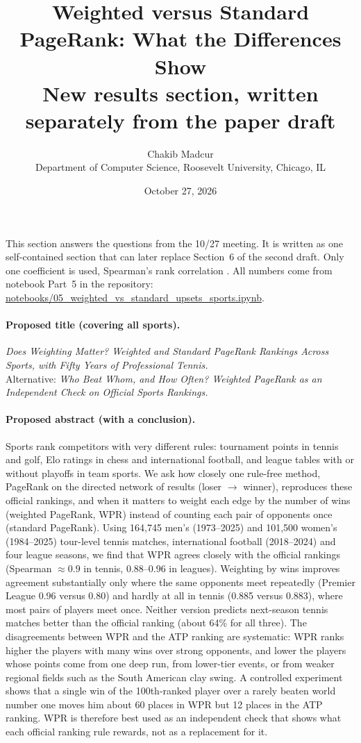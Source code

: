 \documentclass[11pt]{article}
\title{Weighted versus Standard PageRank: What the Differences Show\\[0.4em]
\large New results section, written separately from the paper draft}
\author{Chakib Madcur\\
\small Department of Computer Science, Roosevelt University, Chicago, IL}
\date{October 27, 2026}
\begin{document}
\maketitle

\noindent This section answers the questions from the 10/27 meeting. It is written as one self-contained section that can later replace Section~6 of the second draft. Only one coefficient is used, Spearman's rank correlation \citep{spearman1904}. All numbers come from notebook Part~5 in the repository:\\ \url{notebooks/05_weighted_vs_standard_upsets_sports.ipynb}.

\paragraph{Proposed title (covering all sports).}
\emph{Does Weighting Matter? Weighted and Standard PageRank Rankings Across Sports, with Fifty Years of Professional Tennis.}\\
Alternative: \emph{Who Beat Whom, and How Often? Weighted PageRank as an Independent Check on Official Sports Rankings.}

\paragraph{Proposed abstract (with a conclusion).}
Sports rank competitors with very different rules: tournament points in tennis and golf, Elo ratings in chess and international football, and league tables with or without playoffs in team sports. We ask how closely one rule-free method, PageRank on the directed network of results (loser $\to$ winner), reproduces these official rankings, and when it matters to weight each edge by the number of wins (weighted PageRank, WPR) instead of counting each pair of opponents once (standard PageRank). Using 164,745 men's (1973--2025) and 101,500 women's (1984--2025) tour-level tennis matches, international football (2018--2024) and four league seasons, we find that WPR agrees closely with the official rankings (Spearman $\approx 0.9$ in tennis, 0.88--0.96 in leagues). Weighting by wins improves agreement substantially only where the same opponents meet repeatedly (Premier League 0.96 versus 0.80) and hardly at all in tennis (0.885 versus 0.883), where most pairs of players meet once. Neither version predicts next-season tennis matches better than the official ranking (about 64\% for all three). The disagreements between WPR and the ATP ranking are systematic: WPR ranks higher the players with many wins over strong opponents, and lower the players whose points come from one deep run, from lower-tier events, or from weaker regional fields such as the South American clay swing. A controlled experiment shows that a single win of the 100th-ranked player over a rarely beaten world number one moves him about 60 places in WPR but 12 places in the ATP ranking. WPR is therefore best used as an independent check that shows what each official ranking rule rewards, not as a replacement for it.
\end{document}
